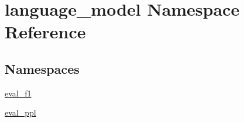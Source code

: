 \hypertarget{namespacelanguage__model}{}\section{language\+\_\+model Namespace Reference}
\label{namespacelanguage__model}
\subsection*{Namespaces}
\begin{DoxyCompactItemize}
\item 
 \hyperlink{namespacelanguage__model_1_1eval__f1}{eval\+\_\+f1}
\item 
 \hyperlink{namespacelanguage__model_1_1eval__ppl}{eval\+\_\+ppl}
\end{DoxyCompactItemize}
